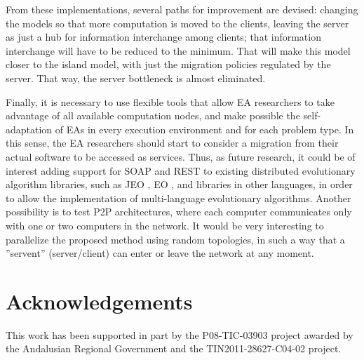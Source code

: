 \documentclass[final,1p,times]{elsarticle}
\begin{document}
\medskip

From these implementations, several paths for improvement are devised: 
changing the models so that more computation is moved to the clients, leaving the server as just a hub for information interchange among clients; that information interchange will have to be reduced to the minimum. That will make this model closer to the island model, with just the migration policies regulated by the server. That way, the server bottleneck is almost eliminated. 


Finally, it is necessary to use flexible tools that allow EA researchers to take advantage of all  available computation nodes, and make possible the self-adaptation of EAs in every execution environment and for each problem type. 
In this sense, the EA researchers should start to consider a migration from their actual software to be accessed as services.
Thus, as future research, it could be of interest adding support for SOAP and REST to existing distributed evolutionary algorithm libraries, such as JEO \cite{maribel:jp2001}, EO \cite{EOEA01}, and libraries in other languages, in order to allow the implementation of multi-language evolutionary algorithms.
Another possibility is to test P2P architectures, where each computer communicates only with one or two computers in the network. 
It would be very interesting to parallelize the proposed method using random topologies, in such a way that a ''servent'' (server/client) can enter or leave the network at any moment.



\section*{Acknowledgements}

This work has been supported in part by 
the P08-TIC-03903 project awarded by the Andalusian Regional Government
and 
the TIN2011-28627-C04-02 project.




\end{document}
